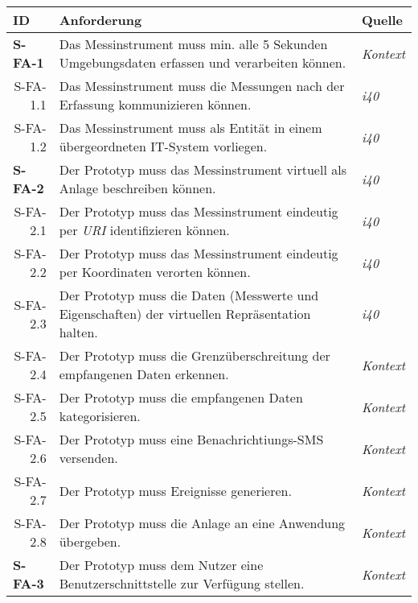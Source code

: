   \begin{tabularx}{\textwidth}{@{}lXp{2cm}@{}}
      \toprule
      ID                & Anforderung & Quelle \\
      \midrule
      \endhead
      \textbf{S-FA-1} \label{sfa1}             &  Das Messinstrument muss min. alle 5 Sekunden Umgebungsdaten erfassen und verarbeiten können.   &  \textit{Kontext}     \\
      \multicolumn{1}{r}{S-FA-1.1} &   Das Messinstrument muss die Messungen nach der Erfassung kommunizieren können. & \textit{\ac{i40}}\\
      \multicolumn{1}{r}{S-FA-1.2} &   Das Messinstrument muss als Entität in einem übergeordneten IT-System vorliegen. & \textit{\ac{i40}}\\
      \textbf{S-FA-2}              &   Der Prototyp muss das Messinstrument virtuell als Anlage beschreiben können. & \textit{\ac{i40}}        \\
      \multicolumn{1}{r}{S-FA-2.1} &   Der Prototyp muss das Messinstrument eindeutig per \textit{URI} identifizieren können.  & \textit{\ac{i40}}\\
      \multicolumn{1}{r}{S-FA-2.2} &   Der Prototyp muss das Messinstrument eindeutig per Koordinaten verorten können.  & \textit{\ac{i40}}\\
      \multicolumn{1}{r}{S-FA-2.3} & Der Prototyp muss die Daten (Messwerte und Eigenschaften) der virtuellen Repräsentation halten.  & \textit{\ac{i40}} \\
      \multicolumn{1}{r}{S-FA-2.4} & Der Prototyp muss die Grenzüberschreitung der empfangenen Daten erkennen. &  \textit{Kontext}\\
      \multicolumn{1}{r}{S-FA-2.5} & Der Prototyp muss die empfangenen Daten kategorisieren. &  \textit{Kontext}\\
      \multicolumn{1}{r}{S-FA-2.6} & Der Prototyp muss eine Benachrichtiungs-SMS versenden.  &  \textit{Kontext}\\
      \multicolumn{1}{r}{S-FA-2.7} & Der Prototyp muss Ereignisse generieren.  &  \textit{Kontext}\\
      \multicolumn{1}{r}{S-FA-2.8} & Der Prototyp muss die Anlage an eine Anwendung übergeben. &  \textit{Kontext} \\
      \textbf{S-FA-3}              &  Der Prototyp muss dem Nutzer eine Benutzerschnittstelle zur Verfügung stellen.    & \textit{Kontext}  \\

\end{tabularx}
